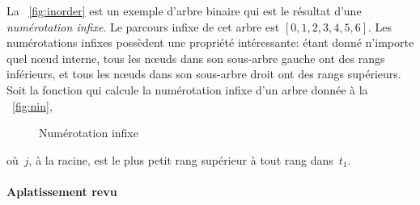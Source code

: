 La \fig~\vref{fig:inorder} est un exemple d'arbre binaire qui est le
résultat d'une \emph{numérotation infixe}. Le parcours infixe de cet arbre est
\([0,1,2,3,4,5,6]\). Les numérotations infixes possèdent une propriété
intéressante: étant donné n'importe quel nœud interne, tous les
nœuds dans son sous-arbre gauche ont des rangs inférieurs, et tous
les nœuds dans son sous-arbre droit ont des rangs supérieurs.
Soit  la
fonction qui calcule la numérotation infixe d'un arbre donnée à la
\fig~\vref{fig:nin},
\begin{figure}[b]
\centering
{}
\caption{Numérotation infixe}
\label{fig:nin}
\end{figure}
où~\(j\), à la racine, est le plus petit rang supérieur à tout
rang dans~\(t_1\).

\paragraph{Aplatissement revu}
\label{par:rotation}

